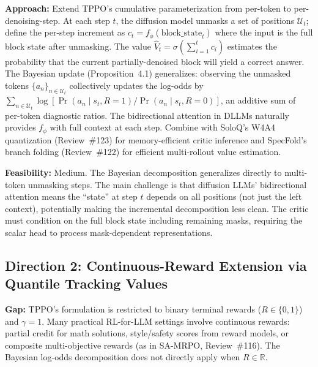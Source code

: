 \documentclass[11pt,a4paper]{article}
\begin{document}
\textbf{Approach:} Extend TPPO's cumulative parameterization from per-token to per-denoising-step. At each step $t$, the diffusion model unmasks a set of positions $\mathcal{U}_t$; define the per-step increment as $c_t = f_\phi(\text{block\_state}_t)$ where the input is the full block state after unmasking. The value $\hat{V}_t = \sigma(\sum_{i=1}^t c_i)$ estimates the probability that the current partially-denoised block will yield a correct answer. The Bayesian update (Proposition~4.1) generalizes: observing the unmasked tokens $\{a_n\}_{n \in \mathcal{U}_t}$ collectively updates the log-odds by $\sum_{n \in \mathcal{U}_t} \log[\Pr(a_n \mid s_t, R{=}1) / \Pr(a_n \mid s_t, R{=}0)]$, an additive sum of per-token diagnostic ratios. The bidirectional attention in DLLMs naturally provides $f_\phi$ with full context at each step. Combine with SoloQ's W4A4 quantization (Review~\#123) for memory-efficient critic inference and SpecFold's branch folding (Review~\#122) for efficient multi-rollout value estimation.

\textbf{Feasibility:} Medium. The Bayesian decomposition generalizes directly to multi-token unmasking steps. The main challenge is that diffusion LLMs' bidirectional attention means the ``state'' at step $t$ depends on all positions (not just the left context), potentially making the incremental decomposition less clean. The critic must condition on the full block state including remaining masks, requiring the scalar head to process mask-dependent representations.

\subsection{Direction 2: Continuous-Reward Extension via Quantile Tracking Values}
\textbf{Gap:} TPPO's formulation is restricted to binary terminal rewards ($R \in \{0, 1\}$) and $\gamma{=}1$. Many practical RL-for-LLM settings involve continuous rewards: partial credit for math solutions, style/safety scores from reward models, or composite multi-objective rewards (as in SA-MRPO, Review~\#116). The Bayesian log-odds decomposition does not directly apply when $R \in \mathbb{R}$.
\end{document}
